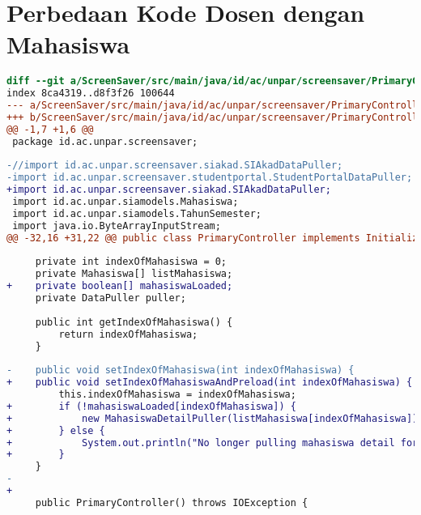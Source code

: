 \chapter{Perbedaan Kode Dosen dengan Mahasiswa}
\label{lamp:D}

\begin{lstlisting}[language=diff, caption=Perbedaan kode dosen dengan mahasiswa, label=diff_dosen_mahasiswa]
diff --git a/ScreenSaver/src/main/java/id/ac/unpar/screensaver/PrimaryController.java b/ScreenSaver/src/main/java/id/ac/unpar/screensaver/PrimaryController.java
index 8ca4319..d8f3f26 100644
--- a/ScreenSaver/src/main/java/id/ac/unpar/screensaver/PrimaryController.java
+++ b/ScreenSaver/src/main/java/id/ac/unpar/screensaver/PrimaryController.java
@@ -1,7 +1,6 @@
 package id.ac.unpar.screensaver;
 
-//import id.ac.unpar.screensaver.siakad.SIAkadDataPuller;
-import id.ac.unpar.screensaver.studentportal.StudentPortalDataPuller;
+import id.ac.unpar.screensaver.siakad.SIAkadDataPuller;
 import id.ac.unpar.siamodels.Mahasiswa;
 import id.ac.unpar.siamodels.TahunSemester;
 import java.io.ByteArrayInputStream;
@@ -32,16 +31,22 @@ public class PrimaryController implements Initializable {
 
     private int indexOfMahasiswa = 0;
     private Mahasiswa[] listMahasiswa;
+    private boolean[] mahasiswaLoaded;
     private DataPuller puller;
 
     public int getIndexOfMahasiswa() {
         return indexOfMahasiswa;
     }
 
-    public void setIndexOfMahasiswa(int indexOfMahasiswa) {
+    public void setIndexOfMahasiswaAndPreload(int indexOfMahasiswa) {
         this.indexOfMahasiswa = indexOfMahasiswa;
+        if (!mahasiswaLoaded[indexOfMahasiswa]) {
+            new MahasiswaDetailPuller(listMahasiswa[indexOfMahasiswa]).start();
+        } else {
+            System.out.println("No longer pulling mahasiswa detail for " + listMahasiswa[indexOfMahasiswa].getNama() + " because already pulled before");
+        }
     }
-
+    
     public PrimaryController() throws IOException {
 

\end{lstlisting}
